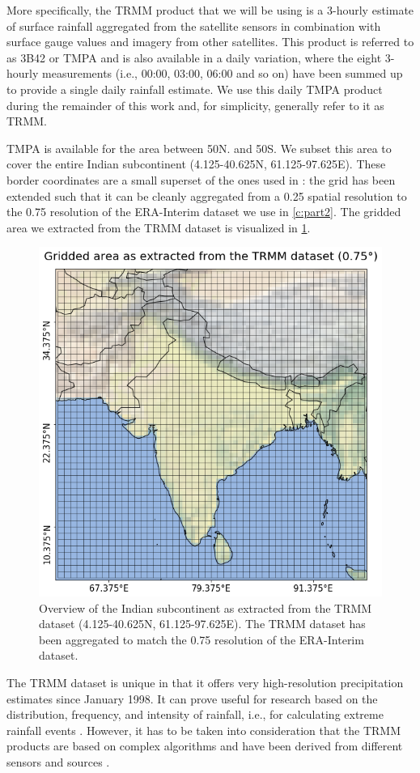 More specifically, the TRMM product that we will be using is a 3-hourly estimate of surface rainfall aggregated from the satellite sensors in combination with surface gauge values and imagery from other satellites. This product is referred to as 3B42 or TMPA and is also available in a daily variation, where the eight 3-hourly measurements (i.e., 00:00, 03:00, 06:00 and so on) have been summed up to provide a single daily rainfall estimate. We use this daily TMPA product during the remainder of this work and, for simplicity, generally refer to it as TRMM.

TMPA is available for the area between 50\degree N. and 50\degree S. We subset this area to cover the entire Indian subcontinent (4.125-40.625\degree N, 61.125-97.625\degree E). These border coordinates are a small superset of the ones used in \citet{Stolbova.2015}: the grid has been extended such that it can be cleanly aggregated from a {0.25\degree} spatial resolution to the {0.75\degree} resolution of the ERA-Interim dataset we use in \cref{c:part2}. The gridded area we extracted from the TRMM dataset is visualized in \cref{fig:trmm_grid}.

\begin{figure}[h]
  \centering
  \includegraphics[width=0.5\linewidth]{./99_appendix/img/area_overview_grid}
  \caption{Overview of the Indian subcontinent as extracted from the TRMM dataset (4.125-40.625\degree N, 61.125-97.625\degree E). The TRMM dataset has been aggregated to match the {0.75\degree} resolution of the ERA-Interim dataset.}
  \label{fig:trmm_grid}
\end{figure}

The TRMM dataset is unique in that it offers very high-resolution precipitation estimates since January 1998. It can prove useful for research based on the distribution, frequency, and intensity of rainfall, i.e., for calculating extreme rainfall events \citep{Stolbova.2015}. However, it has to be taken into consideration that the TRMM products are based on complex algorithms and have been derived from different sensors and sources \citep{Huffman.2017b}.


